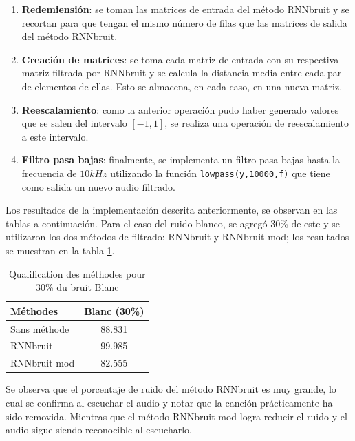\documentclass[conference,onecolumn]{IEEEtran}
\begin{document}
\begin{enumerate} %
    \item \textbf{Redemiensión}: se toman las matrices de entrada del método RNNbruit y se recortan para que tengan el mismo número de filas que las matrices de salida del método RNNbruit.
    
    \item \textbf{Creación de matrices}: se toma cada matriz de entrada con su respectiva matriz filtrada por RNNbruit y se calcula la distancia media entre cada par de elementos de ellas. Esto se almacena, en cada caso, en una nueva matriz.
    
    \item \textbf{Reescalamiento}: como la anterior operación pudo haber generado valores que se salen del intervalo $[-1,1]$, se realiza una operación de reescalamiento a este intervalo.  
    
    \item \textbf{Filtro pasa bajas}: finalmente, se implementa un filtro pasa bajas hasta la frecuencia de $10kHz$ utilizando la función \texttt{lowpass(y,10000,f)} que tiene como salida un nuevo audio filtrado.

\end{enumerate}

Los resultados de la implementación descrita anteriormente, se observan en las tablas a continuación. Para el caso del ruido blanco, se agregó 30\% de este y se utilizaron los dos métodos de filtrado: RNNbruit y RNNbruit mod; los resultados se muestran en la tabla \ref{table:t7}.

\begin{table}[hbt!]
    \centering
    \begin{tabular}{ l  c }
    \textbf{Méthodes} & \textbf{Blanc (30\%)} \\
    \hline
    Sans méthode &  88.831\\
    RNNbruit &  99.985\\
    RNNbruit mod &  82.555\\
    \end{tabular}
    \caption{Qualification des méthodes pour 30\% du bruit Blanc}
    \label{table:t7}
\end{table}

Se observa que el porcentaje de ruido del método RNNbruit es muy grande, lo cual se confirma al escuchar el audio y notar que la canción prácticamente ha sido removida. Mientras que el método RNNbruit mod logra reducir el ruido y el audio sigue siendo reconocible al escucharlo.
\end{document}
